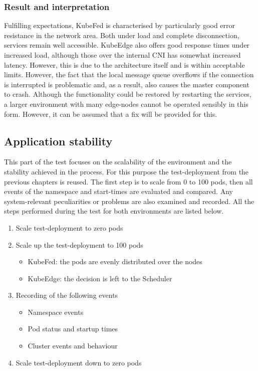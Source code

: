 \documentclass[MIC,Master,english]{twbook}%
\begin{document}
\subsubsection{Result and interpretation} Fulfilling expectations, KubeFed is characterised by particularly good error resistance in the network area. Both under load and complete disconnection, services remain well accessible. KubeEdge also offers good response times under increased load, although those over the internal \ac{CNI} has somewhat increased latency. However, this is due to the architecture itself and is within acceptable limits. However, the fact that the local message queue overflows if the connection is interrupted is problematic and, as a result, also causes the master component to crash. Although the functionality could be restored by restarting the services, a larger environment with many edge-nodes cannot be operated sensibly in this form. However, it can be assumed that a fix will be provided for this.

\subsection{Application stability}
\label{sec:dsrtestapp}
This part of the test focuses on the scalability of the environment and the stability achieved in the process. For this purpose the test-deployment from the previous chapters is reused. The first step is to scale from 0 to 100 pods, then all events of the namespace and start-times are evaluated and compared. Any system-relevant peculiarities or problems are also examined and recorded. All the steps performed during the test for both environments are listed below.

\begin{enumerate}
    \itemsep0em
    \item Scale test-deployment to zero pods
    \item Scale up the test-deployment to 100 pods
    \begin{itemize}
        \item KubeFed: the pods are evenly distributed over the nodes
        \item KubeEdge: the decision is left to the Scheduler
    \end{itemize}
    \item Recording of the following events
    \begin{itemize}
        \itemsep0em
        \item Namespace events
        \item Pod status and startup times
        \item Cluster events and behaviour
    \end{itemize}
    \item Scale test-deployment down to zero pods
\end{enumerate}
\end{document}
